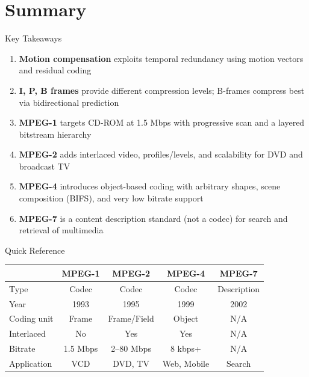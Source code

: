 \documentclass[aspectratio=169,12pt]{beamer}
\begin{document}
\section{Summary}

\begin{frame}{Key Takeaways}
    \begin{enumerate}
        \item \textbf{Motion compensation} exploits temporal redundancy using motion vectors and residual coding
        
        \item \textbf{I, P, B frames} provide different compression levels; B-frames compress best via bidirectional prediction
        
        \item \textbf{MPEG-1} targets CD-ROM at 1.5 Mbps with progressive scan and a layered bitstream hierarchy
        
        \item \textbf{MPEG-2} adds interlaced video, profiles/levels, and scalability for DVD and broadcast TV
        
        \item \textbf{MPEG-4} introduces object-based coding with arbitrary shapes, scene composition (BIFS), and very low bitrate support
        
        \item \textbf{MPEG-7} is a content description standard (not a codec) for search and retrieval of multimedia
    \end{enumerate}
\end{frame}

\begin{frame}{Quick Reference}
    \begin{center}
        \small
        \begin{tabular}{l|c|c|c|c}
            \toprule
            & \textbf{MPEG-1} & \textbf{MPEG-2} & \textbf{MPEG-4} & \textbf{MPEG-7} \\
            \midrule
            Type & Codec & Codec & Codec & Description \\
            Year & 1993 & 1995 & 1999 & 2002 \\
            Coding unit & Frame & Frame/Field & Object & N/A \\
            Interlaced & No & Yes & Yes & N/A \\
            Bitrate & 1.5 Mbps & 2--80 Mbps & 8 kbps+ & N/A \\
            Application & VCD & DVD, TV & Web, Mobile & Search \\
            \bottomrule
        \end{tabular}
    \end{center}
\end{frame}
\end{document}
